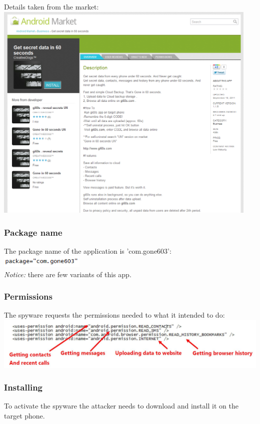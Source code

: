\parbox{\textwidth}{
Details taken from the market: \\
\includegraphics[width=0.95\textwidth]{figs/gone60_2.png}
}

\subsubsection{Package name}
\parbox{\textwidth}{
The package name of the application is 'com.gone603': \\
\includegraphics[width=0.3\textwidth]{figs/gone60_3.png} \\
\emph{Notice:} there are few variants of this app.
}

\subsubsection{Permissions}
\parbox{\textwidth}{
The spyware requests the permissions needed to what it intended to do: \\
\includegraphics[width=\textwidth]{figs/gone60_4.JPG}
}

\subsubsection{Installing}
To activate the spyware the attacker needs to download and install it on the target phone.

